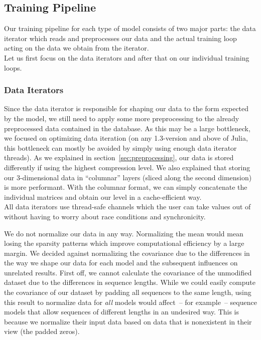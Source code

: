 \subsection{Training Pipeline}
\label{sec:training-pipeline}

Our training pipeline for each type of model consists of two major
parts: the data iterator which reads and preprocesses our data and the
actual training loop acting on the data we obtain from the iterator. \\
Let us first focus on the data iterators and after that on our
individual training loops.

\subsubsection{Data Iterators}

Since the data iterator is responsible for shaping our data to the
form expected by the model, we still need to apply some more
preprocessing to the already preprocessed data contained in the
database. As this may be a large bottleneck, we focused on optimizing
data iteration (on any 1.3-version and above of Julia, this bottleneck
can mostly be avoided by simply using enough data iterator threads).
As we explained in section~\ref{sec:preprocessing}, our data is stored
differently if using the highest compression level. We also explained
that storing our 3-dimensional data in ``columnar'' layers (sliced
along the second dimension) is more performant. With the columnar
format, we can simply concatenate the individual matrices and obtain
our level in a cache-efficient way. \\
All data iterators use thread-safe channels which the user can take
values out of without having to worry about race conditions and
synchronicity.

We do not normalize our data in any way. Normalizing the mean would
mean losing the sparsity patterns which improve computational
efficiency by a large margin. We decided against normalizing the
covariance due to the differences in the way we shape our data for
each model and the subsequent influences on unrelated results. First
off, we cannot calculate the covariance of the unmodified dataset due
to the differences in sequence lengths. While we could easily compute
the covariance of our dataset by padding all sequences to the same
length, using this result to normalize data for \emph{all} models
would affect~-- for example~-- sequence models that allow sequences of
different lengths in an undesired way. This is because we normalize
their input data based on data that is nonexistent in their view (the
padded zeros).

